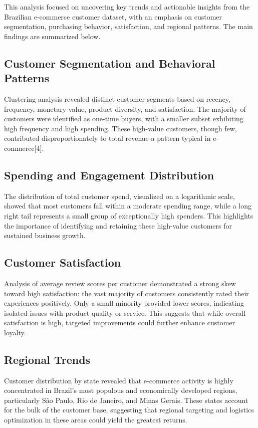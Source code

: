 \documentclass[a4paper]{article}
\begin{document}
\begin{multicols}{2}
This analysis focused on uncovering key trends and actionable insights from the Brazilian e-commerce customer dataset, with an emphasis on customer segmentation, purchasing behavior, satisfaction, and regional patterns. The main findings are summarized below.

\subsection{Customer Segmentation and Behavioral Patterns}
Clustering analysis revealed distinct customer segments based on recency, frequency, monetary value, product diversity, and satisfaction. The majority of customers were identified as one-time buyers, with a smaller subset exhibiting high frequency and high spending. These high-value customers, though few, contributed disproportionately to total revenue-a pattern typical in e-commerce[4].

\subsection{Spending and Engagement Distribution}
The distribution of total customer spend, visualized on a logarithmic scale, showed that most customers fall within a moderate spending range, while a long right tail represents a small group of exceptionally high spenders. This highlights the importance of identifying and retaining these high-value customers for sustained business growth.

\subsection{Customer Satisfaction}
Analysis of average review scores per customer demonstrated a strong skew toward high satisfaction: the vast majority of customers consistently rated their experiences positively. Only a small minority provided lower scores, indicating isolated issues with product quality or service. This suggests that while overall satisfaction is high, targeted improvements could further enhance customer loyalty.

\subsection{Regional Trends}
Customer distribution by state revealed that e-commerce activity is highly concentrated in Brazil’s most populous and economically developed regions, particularly São Paulo, Rio de Janeiro, and Minas Gerais. These states account for the bulk of the customer base, suggesting that regional targeting and logistics optimization in these areas could yield the greatest returns.


\end{multicols}
\end{document}
